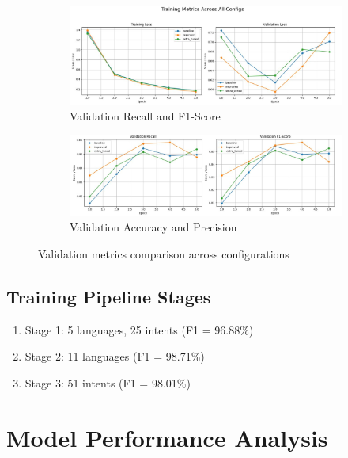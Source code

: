 \documentclass{ecai}
\begin{document}
\begin{figure}[H]
    \centering
    \begin{subfigure}{0.48\textwidth}
        \includegraphics[width=\linewidth]{training_matrices_1.jpeg}
        \caption{Validation Recall and F1-Score}
    \end{subfigure}
    \hfill
    \begin{subfigure}{0.48\textwidth}
        \includegraphics[width=\linewidth]{training_matrices_2.jpeg}
        \caption{Validation Accuracy and Precision}
    \end{subfigure}
    \caption{Validation metrics comparison across configurations}
    \label{fig:val_metrics}
\end{figure}

\subsection{Training Pipeline Stages}
\begin{enumerate}
    \item Stage 1: 5 languages, 25 intents (F1 = 96.88\%)
    \item Stage 2: 11 languages (F1 = 98.71\%)
    \item Stage 3: 51 intents (F1 = 98.01\%)
\end{enumerate}

\section{Model Performance Analysis}
\end{document}
